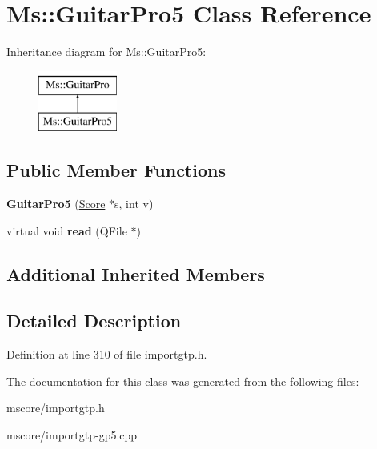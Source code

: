 \hypertarget{class_ms_1_1_guitar_pro5}{}\section{Ms\+:\+:Guitar\+Pro5 Class Reference}
\label{class_ms_1_1_guitar_pro5}
Inheritance diagram for Ms\+:\+:Guitar\+Pro5\+:\begin{figure}[H]
\begin{center}
\leavevmode
\includegraphics[height=2.000000cm]{class_ms_1_1_guitar_pro5}
\end{center}
\end{figure}
\subsection*{Public Member Functions}
\begin{DoxyCompactItemize}
\item 
\mbox{\label{class_ms_1_1_guitar_pro5_aed757eac1f2b6b7e50d2bf6f1ae8f785}} 
{\bfseries Guitar\+Pro5} (\hyperlink{class_ms_1_1_score}{Score} $\ast$s, int v)
\item 
\mbox{\label{class_ms_1_1_guitar_pro5_abbb3df0936c15bedd1d384bde75bb3bc}} 
virtual void {\bfseries read} (Q\+File $\ast$)
\end{DoxyCompactItemize}
\subsection*{Additional Inherited Members}


\subsection{Detailed Description}


Definition at line 310 of file importgtp.\+h.



The documentation for this class was generated from the following files\+:\begin{DoxyCompactItemize}
\item 
mscore/importgtp.\+h\item 
mscore/importgtp-\/gp5.\+cpp\end{DoxyCompactItemize}
